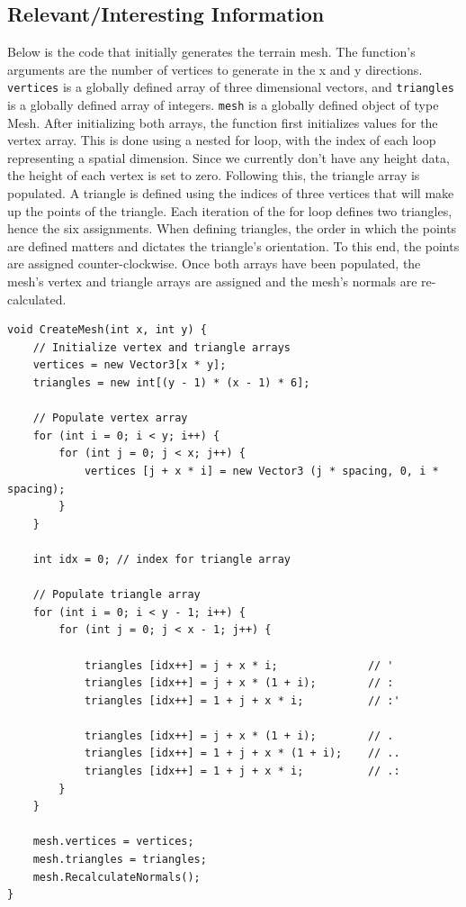 \documentclass[onecolumn, draftclsnofoot,10pt, compsoc]{IEEEtran}
\begin{document}
\subsection{Relevant/Interesting Information}
Below is the code that initially generates the terrain mesh. The function's arguments are the number of vertices to generate in the x and y directions. \texttt{vertices} is a globally defined array of three dimensional vectors, and \texttt{triangles} is a globally defined array of integers. \texttt{mesh} is a globally defined object of type Mesh. After initializing both arrays, the function first initializes values for the vertex array. This is done using a nested for loop, with the index of each loop representing a spatial dimension. Since we currently don't have any height data, the height of each vertex is set to zero. Following this, the triangle array is populated. A triangle is defined using the indices of three vertices that will make up the points of the triangle. Each iteration of the for loop defines two triangles, hence the six assignments. When defining triangles, the order in which the points are defined matters and dictates the triangle's orientation. To this end, the points are assigned counter-clockwise. Once both arrays have been populated, the mesh's vertex and triangle arrays are assigned and the mesh's normals are re-calculated.

\begin{lstlisting}
void CreateMesh(int x, int y) {
    // Initialize vertex and triangle arrays
    vertices = new Vector3[x * y];
	triangles = new int[(y - 1) * (x - 1) * 6];

	// Populate vertex array
	for (int i = 0; i < y; i++) {
		for (int j = 0; j < x; j++) {
			vertices [j + x * i] = new Vector3 (j * spacing, 0, i * spacing);
		}
	}

	int idx = 0; // index for triangle array

	// Populate triangle array
	for (int i = 0; i < y - 1; i++) {
		for (int j = 0; j < x - 1; j++) {

			triangles [idx++] = j + x * i; 				// '
			triangles [idx++] = j + x * (1 + i);		// :
			triangles [idx++] = 1 + j + x * i;	 		// :'

			triangles [idx++] = j + x * (1 + i);		// .
			triangles [idx++] = 1 + j + x * (1 + i); 	// ..
			triangles [idx++] = 1 + j + x * i; 			// .:
		}
	}

	mesh.vertices = vertices;
	mesh.triangles = triangles;
	mesh.RecalculateNormals();
}
\end{lstlisting}
\end{document}
